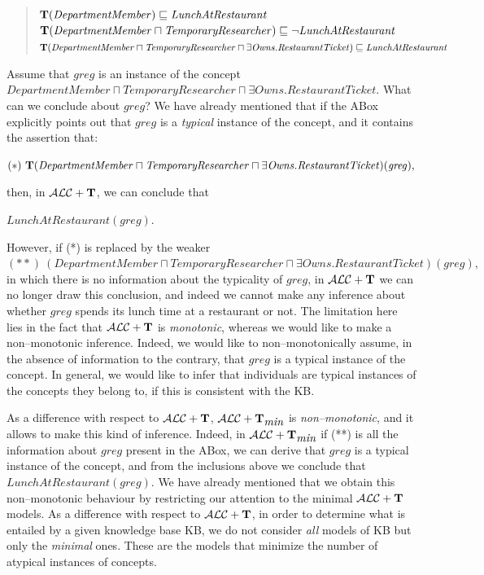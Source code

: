 \documentclass[a4paper, 11pt, oneside]{duthesis}
\newcommand{\tip}{{\bf T}}
\newcommand{\alct}{\mathcal{ALC}+\tip}
\newcommand{\alctmin}{\mathcal{ALC}+\tip_{\mbox{\em min}}}
\newcommand{\nott} {\lnot}
\newcommand{\sqset}{\sqsubseteq}
\newcommand{\mint}{\sqcap}
\begin{document}
\begin{quote}
$\tip (\mathit{DepartmentMember}) \sqset \mathit{LunchAtRestaurant}$\\
$\tip (\mathit{DepartmentMember} \mint \mathit{TemporaryResearcher})  \sqset \nott \mathit{LunchAtRestaurant}$\\
$\tip (\mathit{DepartmentMember} \mint \mathit{TemporaryResearcher} \mint \exists \mathit{Owns}.\mathit{RestaurantTicket})  \sqset \mathit{LunchAtRestaurant}$
\end{quote}

\noindent Assume that $\mathit{greg}$ is an instance of the concept
$\mathit{DepartmentMember} \sqcap \mathit{TemporaryResearcher} \sqcap \exists \mathit{Owns}.\mathit{RestaurantTicket}$. What can we conclude about
$\mathit{\mathit{greg}}$? We have already mentioned that if the ABox explicitly points out that $\mathit{greg}$ is a {\em typical} instance of the  concept, and it contains the assertion that:

$(*)  \ \tip(\mathit{DepartmentMember} \sqcap \mathit{TemporaryResearcher} \sqcap \exists \mathit{Owns}.\mathit{RestaurantTicket})(\mathit{greg}),$


\noindent then, in $\alct$, we can conclude that

$\mathit{LunchAtRestaurant(\mathit{greg})}.$

\noindent However, if (*) is replaced by the weaker $(**)  \ (\mathit{DepartmentMember} \sqcap \mathit{TemporaryResearcher} \sqcap \exists \mathit{Owns}.
\mathit{RestaurantTicket})(\mathit{greg}),$ in which there is no information about the typicality of $\mathit{greg}$, in $\alct$ we can no longer draw this conclusion, and indeed we cannot make any inference about whether $\mathit{greg}$ spends its lunch time at a restaurant or not. The limitation here lies in the fact that $\alct$ is {\em monotonic}, whereas we would like to make a non--monotonic inference.
Indeed, we would like to non--monotonically assume, in the absence of information to the contrary, that $\mathit{greg}$ is a typical instance of the concept.
In general, we would like to infer that individuals are typical instances of the concepts they belong to, if this is consistent with the KB.

As a difference with respect to $\alct$, $\alctmin$ is {\em non--monotonic}, and it allows to make this kind of inference.
Indeed, in $\alctmin$ if (**) is all the information about $\mathit{greg}$ present in the ABox, we can derive that $\mathit{greg}$ is a typical instance of the concept, and from the inclusions above we conclude that $\mathit{LunchAtRestaurant(\mathit{greg})}.$
We have already mentioned that we obtain this non--monotonic behaviour by restricting our attention to the  minimal $\alct$ models.
As a difference with respect to $\alct$, in order to determine what is entailed by a given knowledge base KB, we do not consider {\em all} models of KB but only the {\em minimal} ones.
These are the models that minimize the number of atypical instances of concepts.
\end{document}
